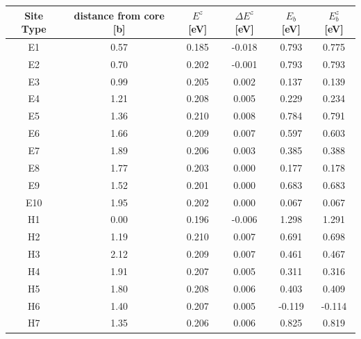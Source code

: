 \documentclass[a4paper]{article}
\begin{document}
{\begin{table}
\label{orge77f861}
    \begin{tabular}{cccccc}
    \hline
Site Type & distance from core [b] & $E^{z}$ [eV] & $\Delta E^{z}$ [eV] & $E_b$ [eV] & $E_b^{z}$ [eV]  \\ 
     \hline
E1        &                   0.57 &   0.185      & 	     -0.018 &       0.793 &          0.775 \\
E2        &                   0.70 &   0.202      & 	     -0.001 &       0.793 &          0.793 \\
E3        &                   0.99 &   0.205      & 	      0.002 &       0.137 &          0.139 \\
E4        &                   1.21 &   0.208      & 	      0.005 &       0.229 &          0.234 \\
E5        &                   1.36 &   0.210      & 	      0.008 &       0.784 &          0.791 \\
E6        &                   1.66 &   0.209      & 	      0.007 &       0.597 &          0.603 \\
E7        &                   1.89 &   0.206      & 	      0.003 &       0.385 &          0.388 \\
E8        &                   1.77 &   0.203      & 	      0.000 &       0.177 &          0.178 \\
E9        &                   1.52 &   0.201      & 	      0.000 &       0.683 &          0.683 \\
E10       &                   1.95 &   0.202      & 	      0.000 &       0.067 &          0.067 \\
H1        &                   0.00 &   0.196      & 	     -0.006 &       1.298 &          1.291 \\
H2        &                   1.19 &   0.210      & 	      0.007 &       0.691 &          0.698 \\
H3        &                   2.12 &   0.209      & 	      0.007 &       0.461 &          0.467 \\
H4        &                   1.91 &   0.207      & 	      0.005 &       0.311 &          0.316 \\
H5        &                   1.80 &   0.208      & 	      0.006 &       0.403 &          0.409 \\
H6        &                   1.40 &   0.207      & 	      0.005 &      -0.119 &         -0.114 \\
H7        &                   1.35 &   0.206      & 	      0.006 &       0.825 &          0.819 \\


\end{tabular}
\end{table}}
\end{document}
